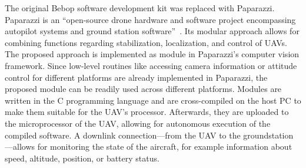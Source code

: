 \documentclass{report}
\begin{document}
The original Bebop software development kit was replaced with
Paparazzi. Paparazzi is an ``open-source drone hardware and software
project encompassing autopilot systems and ground station
software''~\cite{paparazzi}. Its modular approach allows for combining
functions regarding stabilization, localization, and control of UAVs.
The proposed approach is implemented as module in Paparazzi's computer
vision framework. Since low-level routines like accessing camera
information or attitude control for different platforms are already
implemented in Paparazzi, the proposed module can be readily used
across different platforms. Modules are written in the C programming
language and are cross-compiled on the host PC to make them suitable
for the UAV's processor. Afterwards, they are uploaded to the
microprocessor of the UAV, allowing for autonomous execution of the
compiled software. A downlink connection---from the UAV to the
groundstation---allows for monitoring the state of the aircraft, for
example information about speed, altitude, position, or battery
status.
\end{document}
